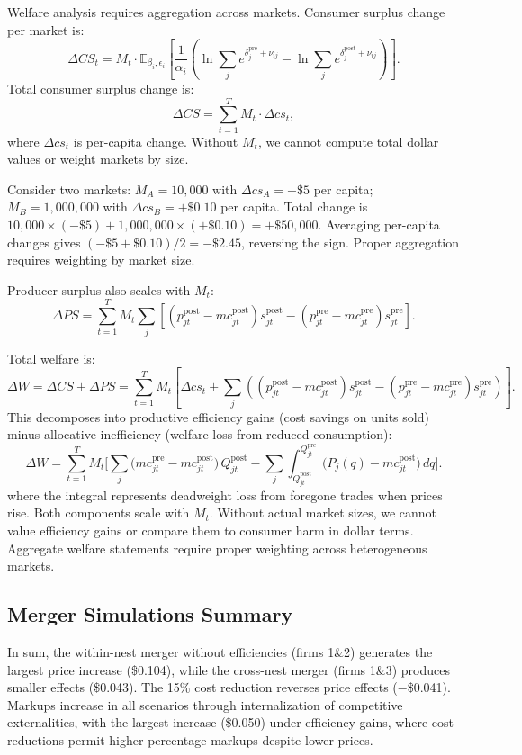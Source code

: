 \documentclass[english,11pt]{article}
\begin{document}
\begin{enumerate}
Welfare analysis requires aggregation across markets. Consumer surplus change per market is:
\[
\Delta CS_t = M_t \cdot \mathbb{E}_{\beta_i, \epsilon_i} \left[\frac{1}{\alpha_i} \left(\ln \sum_j e^{\delta_j^{\text{pre}} + \nu_{ij}} - \ln \sum_j e^{\delta_j^{\text{post}} + \nu_{ij}}\right)\right].
\]
Total consumer surplus change is:
\[
\Delta CS = \sum_{t=1}^{T} M_t \cdot \Delta cs_t,
\]
where $\Delta cs_t$ is per-capita change. Without $M_t$, we cannot compute total dollar values or weight markets by size.

Consider two markets: $M_A = 10{,}000$ with $\Delta cs_A = -\$5$ per capita; $M_B = 1{,}000{,}000$ with $\Delta cs_B = +\$0.10$ per capita. Total change is $10{,}000 \times (-\$5) + 1{,}000{,}000 \times (+\$0.10) = +\$50{,}000$. Averaging per-capita changes gives $(-\$5 + \$0.10)/2 = -\$2.45$, reversing the sign. Proper aggregation requires weighting by market size.

Producer surplus also scales with $M_t$:
\[
\Delta PS = \sum_{t=1}^{T} M_t \sum_{j} \left[(p_{jt}^{\text{post}} - mc_{jt}^{\text{post}}) s_{jt}^{\text{post}} - (p_{jt}^{\text{pre}} - mc_{jt}^{\text{pre}}) s_{jt}^{\text{pre}}\right].
\]

Total welfare is:
\[
\Delta W = \Delta CS + \Delta PS = \sum_{t=1}^{T} M_t \left[\Delta cs_t + \sum_{j} \left((p_{jt}^{\text{post}} - mc_{jt}^{\text{post}}) s_{jt}^{\text{post}} - (p_{jt}^{\text{pre}} - mc_{jt}^{\text{pre}}) s_{jt}^{\text{pre}}\right)\right].
\]
This decomposes into productive efficiency gains (cost savings on units sold) minus allocative inefficiency (welfare loss from reduced consumption):
\[
\Delta W = \sum_{t=1}^{T} M_t \Bigg[
\sum_j \big( mc_{jt}^{\mathrm{pre}} - mc_{jt}^{\mathrm{post}} \big)\, Q_{jt}^{\mathrm{post}}
- \sum_j \int_{Q_{jt}^{\mathrm{post}}}^{Q_{jt}^{\mathrm{pre}}} \big( P_j(q) - mc_{jt}^{\mathrm{post}} \big)\, dq
\Bigg].
\]
where the integral represents deadweight loss from foregone trades when prices rise. Both components scale with $M_t$. Without actual market sizes, we cannot value efficiency gains or compare them to consumer harm in dollar terms. Aggregate welfare statements require proper weighting across heterogeneous markets.


\subsection*{Merger Simulations Summary}

\noindent In sum, the within-nest merger without efficiencies (firms 1\&2) generates the largest price increase (\$0.104), while the cross-nest merger (firms 1\&3) produces smaller effects (\$0.043). The 15\% cost reduction reverses price effects ($-$\$0.041). Markups increase in all scenarios through internalization of competitive externalities, with the largest increase (\$0.050) under efficiency gains, where cost reductions permit higher percentage markups despite lower prices.


\end{enumerate}
\end{document}
